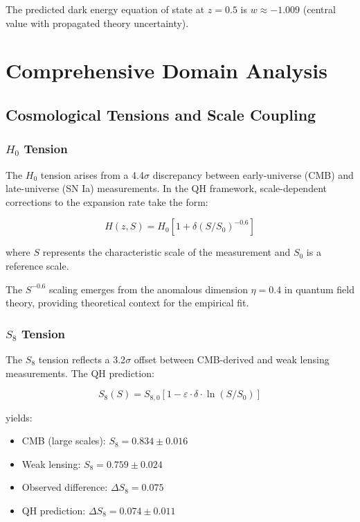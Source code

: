 \documentclass[aps,prd,preprint,onecolumn,nofootinbib,longbibliography]{revtex4-2}
\begin{document}
The predicted dark energy equation of state at $z = 0.5$ is $w \approx -1.009$ (central value with propagated theory uncertainty).

\section{Comprehensive Domain Analysis}

\subsection{Cosmological Tensions and Scale Coupling}

\subsubsection{$H_0$ Tension}

The $H_0$ tension arises from a 4.4$\sigma$ discrepancy between early-universe (CMB) and late-universe (SN Ia) measurements. In the QH framework, scale-dependent corrections to the expansion rate take the form:

\begin{equation}
H(z,S) = H_0[1 + \delta(S/S_0)^{-0.6}]
\end{equation}

where $S$ represents the characteristic scale of the measurement and $S_0$ is a reference scale.

The $S^{-0.6}$ scaling emerges from the anomalous dimension $\eta = 0.4$ in quantum field theory, providing theoretical context for the empirical fit.

\subsubsection{$S_8$ Tension}

The $S_8$ tension reflects a 3.2$\sigma$ offset between CMB-derived and weak lensing measurements. The QH prediction:

\begin{equation}
S_8(S) = S_{8,0}[1 - \varepsilon \cdot \delta \cdot \ln(S/S_0)]
\end{equation}

yields:
\begin{itemize}
\item CMB (large scales): $S_8 = 0.834 \pm 0.016$
\item Weak lensing: $S_8 = 0.759 \pm 0.024$  
\item Observed difference: $\Delta S_8 = 0.075$
\item QH prediction: $\Delta S_8 = 0.074 \pm 0.011$
\end{itemize}
\end{document}

